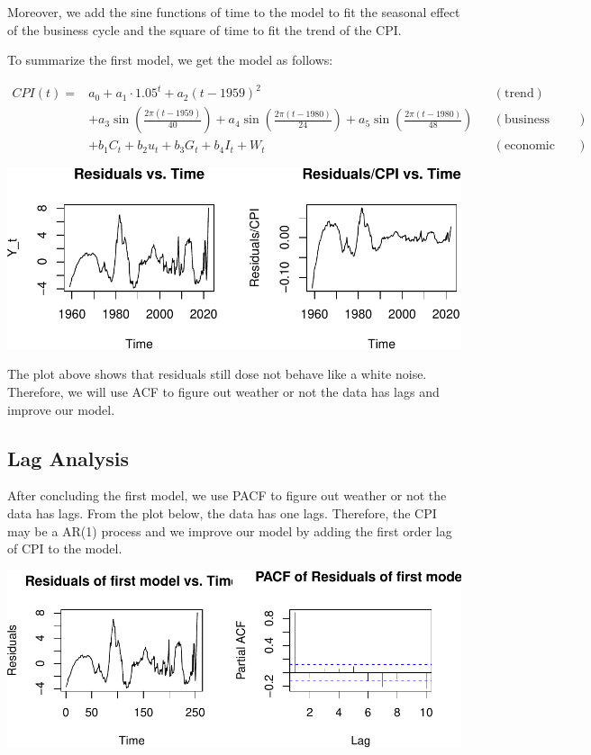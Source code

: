 \documentclass[
  man,floatsintext,
  man]{apa6}
\begin{document}
Moreover, we add the sine functions of time to the model to fit the seasonal effect of the business cycle and the square of time to fit the trend of the CPI.

To summarize the first model, we get the model as follows:

\begin{align*}
CPI(t) =& a_0 + a_1 \cdot 1.05^t  + a_2 (t-1959)^2 && (\text{trend})\\
& + a_3 \sin\left(\frac{2\pi(t-1959)}{40}\right) + a_4 \sin\left(\frac{2\pi(t-1980)}{24}\right) + a_5 \sin\left(\frac{2\pi(t-1980)}{48}\right) && (\text{business cycle})\\
& + b_1 C_t + b_2 u_t + b_3 G_t + b_4 I_t + W_t && (\text{economic variables})
\end{align*}

\includegraphics{stat429_group2_final_proj_files/figure-latex/unnamed-chunk-3-1.pdf}

The plot above shows that residuals still dose not behave like a white noise.
Therefore, we will use ACF to figure out weather or not the data has lags and improve our model.

\subsection{Lag Analysis}\label{lag-analysis}

After concluding the first model, we use PACF to figure out weather or not the data has lags.
From the plot below, the data has one lags.
Therefore, the CPI may be a AR(1) process
and we improve our model by adding the first order lag of CPI to the model.

\includegraphics{stat429_group2_final_proj_files/figure-latex/unnamed-chunk-4-1.pdf}
\end{document}
